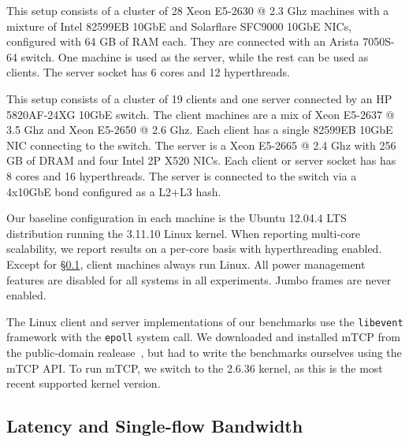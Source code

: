 
 
 This setup consists of a
cluster of 28 Xeon E5-2630 @ 2.3 Ghz machines with a mixture of
Intel 82599EB 10GbE and Solarflare SFC9000 10GbE NICs, configured
with 64 GB of RAM each. They are connected with an Arista 7050S-64
switch. One machine is used as the server, while the rest can be used
as clients. The server socket has 6 cores and 12 hyperthreads.

 This setup consists of a cluster of 19
clients and one server connected by an HP 5820AF-24XG 10GbE switch.
The client machines are a mix of Xeon E5-2637 @ 3.5 Ghz and Xeon
E5-2650 @ 2.6 Ghz.  Each client has a single 82599EB 10GbE NIC
connecting to the switch.  The server is a Xeon E5-2665 @ 2.4 Ghz with
256 GB of DRAM and four Intel 2P X520 NICs.  Each client or server
socket has has 8 cores and 16 hyperthreads.  The server is connected
to the switch via a 4x10GbE bond configured as a L2+L3 hash.

 Our baseline configuration in each
machine is the Ubuntu 12.04.4 LTS distribution running the 3.11.10
Linux kernel.  When reporting multi-core scalability, we report
results on a per-core basis with hyperthreading enabled.  Except for
\S\ref{sec:eval:netpipe}, client machines always run Linux. All power
management features are disabled for all systems in all
experiments. Jumbo frames are never enabled.




%

%


The Linux client and server implementations of our benchmarks use the
\texttt{libevent} framework with the \texttt{epoll} system call.  We
downloaded and installed mTCP from the public-domain
realease~\cite{url:mtcp}, but had to write the benchmarks ourselves
using the mTCP API.  To run mTCP, we switch to the 2.6.36 kernel, as
this is the most recent supported kernel version.

\subsection{Latency and Single-flow Bandwidth}
\label{sec:eval:netpipe}

